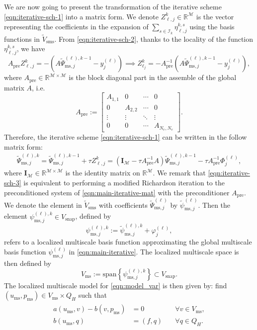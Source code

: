 \documentclass{article}[11pt]
\theoremstyle{definition}
\begin{document}
We are now going to present the transformation of the iterative scheme \eqref{eqn:iterative-sch-1} into a matrix form. We denote $Z_{\ell, j}^{k} \in \mathbb{R}^{\mathcal{M}}$ is the vector representing the coefficients in the expansion of $\sum_{s\in \mathcal{I}_k}  \eta_{\ell,j}^{k,s}$ using the basis functions in $\tilde V_{\text{sms}}$. From \eqref{eqn:iterative-sch-2}, thanks to the locality of the function $\eta_{\ell,j}^{k,s}$, we have 
$$ A_{\text{pre}} Z_{\ell,j}^{k} = -(A \tilde\Psi_{\text{ms},j}^{(\ell), k-1} - y_j^{(\ell)}) \implies Z_{\ell_j}^{k} = - A_{\text{pre}}^{-1} (A\tilde\Psi_{\text{ms}, j}^{(\ell), k-1} - y_j^{(\ell)}),$$
where $A_{\text{pre}} \in \mathbb{R}^{\mathcal{M} \times \mathcal{M}}$ is the block diagonal part in the assemble of the global matrix $A$, i.e.  
$$ A_{\text{pre}} :=  \left [ \begin{array}{cccc}
A_{1,1} & 0 & \cdots & 0 \\
0 & A_{2,2} & \cdots & 0 \\
\vdots & \vdots & \ddots & \vdots \\
0 & 0 & \cdots & A_{N_e, N_e} 
\end{array}\right ].$$
Therefore, the iterative scheme \eqref{eqn:iterative-sch-1} can be written in the follow matrix form: 
\begin{eqnarray}\label{eqn:iterative-sch-3}
\tilde\Psi_{\text{ms}, j}^{(\ell),k} = \tilde\Psi_{\text{ms}, j}^{(\ell),k-1} + \tau Z_{\ell,j}^{k} = (\mathbf{I}_{\mathcal{M}} - \tau A_{\text{pre}}^{-1} A)\tilde\Psi_{\text{ms}, j}^{(\ell), k-1} -\tau A_{\text{pre}}^{-1}\Phi_j^{(\ell)}, 
\end{eqnarray}
where $\mathbf{I}_{\mathcal{M}} \in \mathbb{R}^{\mathcal{M} \times \mathcal{M}}$ is the identity matrix on $\mathbb{R}^{\mathcal{M}}$. 
We remark that \eqref{eqn:iterative-sch-3} is equivalent to performing a modified Richardson iteration to the preconditioned system of \eqref{eqn:main-iterative-mat} with the preconditioner $A_{\text{pre}}$. 
We denote the element in $\tilde V_{\text{sms}}$ with coefficients $\tilde{\Psi}^{(\ell)}_{\text{ms},j}$ by $\tilde \psi^{(\ell)}_{\text{ms},j}$. 
Then the element $\psi^{(\ell),k}_{\text{ms},j} \in V_{\text{snap}}$, defined by 
\begin{equation}\label{eqn:loc_basis}
\psi^{(\ell),k}_{\text{ms},j}:=\tilde \psi^{(\ell),k}_{\text{ms},j} + \varphi^{(\ell)}_j,
\end{equation}
refers to a localized multiscale basis function approximating the global multiscale basis function $\psi^{(\ell)}_{\text{ms},j}$ in \eqref{eqn:main-iterative}. The localized multiscale space is then defined by 
$$V_{\text{ms}} :=\text{span}\left \{\psi^{(\ell),k}_{\text{ms},j} \right \} \subset V_{\text{snap}}.$$
The localized multiscale model for \eqref{eqn:model_var} is then given by: find 
$(u_{\text{ms}}, p_{\text{ms}}) \in V_{\text{ms}} \times Q_H$ such that 
\begin{eqnarray}\label{eqn:loc_msm}
\begin{split}
a(u_{\text{ms}},v)-b(v,p_{\text{ms}}) & =0 & \quad \forall v\in V_{\text{ms}},\\
b(u_{\text{ms}},q) & =(f,q) & \quad \forall q\in Q_{H}. 
\end{split}
\end{eqnarray}
\end{document}
